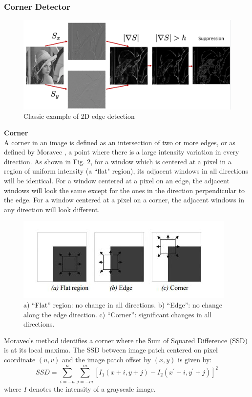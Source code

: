 \documentclass[twoside]{article}
\begin{document}
\subsubsection{Corner Detector}

\begin{figure}[h]
  \centering
  \includegraphics[scale=.32]{application.PNG}
    \caption{Classic example of 2D edge detection}
    \label{edge_app}
\end{figure}

\textbf{Corner}\\
A corner in an image is defined as an intersection of two or more edges, or as defined by Moravec \cite{Moravec}, a point where there is a large intensity variation in every direction. As shown in Fig. \ref{corner}, for a window which is centered at a pixel in a region of uniform intensity (a ``flat" region), its adjacent windows in all directions will be identical. For a window centered at a pixel on an edge, the adjacent windows will look the same except for the ones in the direction perpendicular to the edge. For a window centered at a pixel on a corner, the adjacent windows in any direction will look different.
\begin{figure}
  \centering
  \includegraphics{corner.JPG}
    \caption{a) ``Flat'' region: no change in all directions. b) ``Edge'': no change along the edge direction. c) ``Corner'': significant changes in all directions. \cite{SNS}}
    \label{corner}
\end{figure}

Moravec's method identifies a corner where the Sum of Squared Difference (SSD) is at its local maxima. The SSD between image patch centered on pixel coordinate $(u,v)$ and the image patch offset by $(x,y)$ is given by:
\begin{equation}
SSD = \sum_{i=-n}^n \sum_{j=-m}^m [I_1(x+i,y+j)-I_2(x^\prime+i,y^\prime+j)]^2
\end{equation}
where $I$ denotes the intensity of a grayscale image. \\
\end{document}
